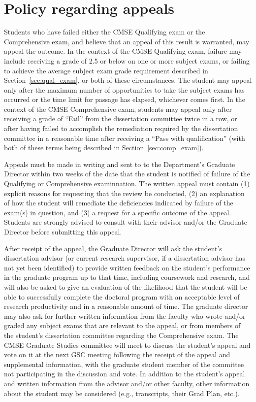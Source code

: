 \section[Policy regarding appeals]{Policy regarding
  appeals}
\label{sec:appeals}

Students who have failed either the CMSE Qualifying exam or the
Comprehensive exam, and believe that an appeal of this result is
warranted, may appeal the outcome.  In the context of the CMSE
Qualifying exam, failure may include receiving a grade of 2.5 or below
on one or more subject exams, or failing to achieve the average
subject exam grade requirement described in
Section~\ref{sec:qual_exam}, or both of these circumstances.  The
student may appeal only after the maximum number of opportunities to
take the subject exams has occurred or the time limit for passage has
elapsed, whichever comes first.  In the context of the CMSE
Comprehensive exam, students may appeal only after receiving a grade
of ``Fail'' from the dissertation committee twice in a row, or after
having failed to accomplish the remediation required by the
dissertation committee in a reasonable time after receiving a ``Pass
with qualification'' (with both of these terms being described in
Section~\ref{sec:comp_exam}).

Appeals must be made in writing and sent to to the Department's
Graduate Director within two weeks of the date that the student is
notified of failure of the Qualifying or Comprehensive examinnation.
The written appeal must contain (1) explicit reasons for requesting
that the review be conducted, (2) an explanation of how the student
will remediate the deficiencies indicated by failure of the exam(s) in
question, and (3) a request for a specific outcome of the appeal.
Students are strongly advised to consult with their advisor and/or the
Graduate Director before submitting this appeal.

After receipt of the appeal, the Graduate Director will ask the
student's dissertation advisor (or current research supervisor, if a
dissertation advisor has not yet been identified) to provide written
feedback on the student's performance in the graduate program up to
that time, including coursework and research, and will also be asked
to give an evaluation of the likelihood that the student will be able
to successfully complete the doctoral program with an acceptable level
of research productivity and in a reasonable amount of time.  The
graduate director may also ask for further written information from
the faculty who wrote and/or graded any subject exams that are
relevant to the appeal, or from members of the student's dissertation
committee regarding the Comprehensive exam.  The CMSE Graduate Studies
committee will meet to discuss the student's appeal and vote on it at
the next GSC meeting following the receipt of the appeal and
supplemental information, with the graduate student member of the
committee not participating in the discussion and vote.  In addition
to the student’s appeal and written information from the advisor
and/or other faculty, other information about the student may be
considered (e.g., transcripts, their Grad Plan, etc.).


